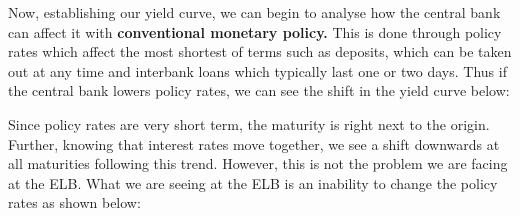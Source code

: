 \documentclass[12pt, letterpaper]{article}
\begin{document}
Now, establishing our yield curve, we can begin to analyse how the central bank can affect it with \textbf{conventional monetary policy.} This is done through policy rates which affect the most shortest of terms such as deposits, which can be taken out at any time and interbank loans which typically last one or two days. Thus if the central bank lowers policy rates, we can see the shift in the yield curve below:
\begin{center}
\end{center}
Since policy rates are very short term, the maturity is right next to the origin. Further, knowing that interest rates move together, we see a shift downwards at all maturities following this trend. However, this is not the problem we are facing at the ELB. What we are seeing at the ELB is an inability to change the policy rates as shown below:
\end{document}
